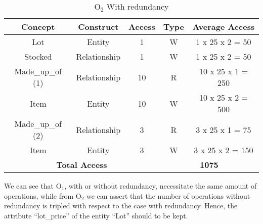 \begin{table}[!h]\caption{	$ \textrm{O}_\textrm{2} $ With redundancy}
	\begin{center}
		\begin{tabular}{| c | c | c | c | c |}
			\hline
			\textbf{Concept} & \textbf{Construct} & \textbf{Access} & \textbf{Type} & \textbf{Average Access} \\ \hline
			Lot & Entity & 1 & W & 1 x 25 x 2 = 50 \\ \hline
			Stocked & Relationship & 1 & W & 1 x 25 x 2 = 50 \\ \hline
			Made\_up\_of (1) & Relationship & 10 & R & 10 x 25 x 1 = 250 \\ \hline
			Item & Entity & 10 & W & 10 x 25 x 2 = 500 \\ \hline
			Made\_up\_of (2) & Relationship & 3 & R & 3 x 25 x 1 = 75 \\ \hline
			Item & Entity & 3 & W & 3 x 25 x 2 = 150 \\ \hline
			\multicolumn{3}{|c|}{\textbf{Total Access}} & \multicolumn{2}{|c|}{\textbf{1075}} \\ \hline
		\end{tabular}
	\end{center}
\end{table}

We can see that $ \textrm{O}_\textrm{1} $, with or without redundancy, necessitate the same amount of operations, while from $ \textrm{O}_\textrm{2} $ we can assert that the number of operations without redundancy is tripled with respect to the case with redundancy. Hence, the attribute ``lot\_price'' of the entity ``Lot'' should to be kept.

